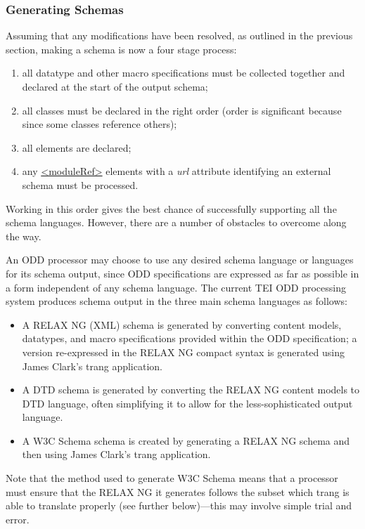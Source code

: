 \subsubsection[{Generating Schemas}]{Generating Schemas}\label{IMGS}\par
Assuming that any modifications have been resolved, as outlined in the previous section, making a schema is now a four stage process: \begin{enumerate}
\item all datatype and other macro specifications must be collected together and declared at the start of the output schema;
\item all classes must be declared in the right order (order is significant because since some classes reference others);
\item all elements are declared;
\item any \hyperref[TEI.moduleRef]{<moduleRef>} elements with a {\itshape url} attribute identifying an external schema must be processed.
\end{enumerate} Working in this order gives the best chance of successfully supporting all the schema languages. However, there are a number of obstacles to overcome along the way.\par
An ODD processor may choose to use any desired schema language or languages for its schema output, since ODD specifications are expressed as far as possible in a form independent of any schema language.  The current TEI ODD processing system produces schema output in the three main schema languages as follows: \begin{itemize}
\item A RELAX NG (XML) schema is generated by converting content models, datatypes, and macro specifications provided within the ODD specification; a version re-expressed in the RELAX NG compact syntax is generated using James Clark's  {\name trang} application.
\item A DTD schema is generated by converting the RELAX NG content models to DTD language, often simplifying it to allow for the less-sophisticated output language.
\item A W3C Schema schema is created by generating a RELAX NG schema and then using James Clark's  {\name trang} application.
\end{itemize}  Note that the method used to generate W3C Schema means that a processor must ensure that the RELAX NG it generates follows the subset which  {\name trang} is able to translate properly (see further below)—this may involve simple trial and error.\par
